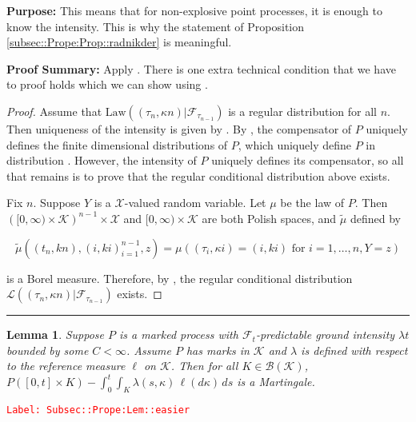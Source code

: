 \documentclass[12pt]{article}
\newcommand{\mc}{\mathcal}
\newcommand{\ms}{\mathscr}
\newcommand{\te}{\text}
\newcommand{\tr}{\textcolor{red}}
\newcommand{\labe}[1]{\tr{\texttt{Label: #1}}}
\newcommand{\purpose}{\textbf{Purpose: }}
\newcommand{\pfsum}{\textbf{Proof Summary: }}
\newcommand{\ind}{\hspace{24pt}}
\newcommand{\lin}{\rule{\linewidth}{0.4 pt}}
\renewcommand{\S}{S}							%
\renewcommand{\t}{t}							%
\renewcommand{\tt}{s}							%
\newcommand{\F}{\mc{F}}							%
\newcommand{\ts}[1]{_{#1}}						%
\newcommand{\const}{C}							%
\newcommand{\Sm}{\ell}							%
\newcommand{\rate}{\lambda}						%
\newcommand{\alt}[1]{\widetilde{#1}}			%
\newcommand{\indx}[1]{_{#1}}					%
\newcommand{\m}{\mu}							%
\newcommand{\law}{\te{Law}}						%
\newcommand{\XX}{Y}								%
\newcommand{\rt}{\tau}							%
\renewcommand{\mark}{\kappa}					%
\newcommand{\rp}{P}								%
\newcommand{\spce}{\mc{X}}						%
\newcommand{\xxx}{z}							%
\newcommand{\mspce}{\mc{K}}						%
\newtheorem{lem}[thms]{Lemma}
\begin{document}
\purpose This means that for non-explosive point processes, it is enough to know the intensity. This is why the statement of Proposition \ref{subsec::Prope:Prop::radnikder} is meaningful.

\pfsum Apply \cite[Propositions 14.3.II(b),14.2.IV(c) and 9.2.III]{DalVer08}. There is one extra technical condition that we have to proof holds which we can show using \cite[Proposition A1.5.III]{DalVer03}.

\begin{proof}
Assume that \(\law((\rt\indx{n},\mark{n})|\F\ts{\rt\indx{n-1}})\) is a regular distribution for all \(n\). Then uniqueness of the intensity is given by \cite[Proposition 14.3.II (b)]{DalVer08}. By \cite[Proposition 14.2.IV (c)]{DalVer08}, the compensator of \(\rp\) uniquely defines the finite dimensional distributions of \(\rp\), which uniquely define \(\rp\) in distribution \cite[Proposition 9.2.III]{DalVer08}. However, the intensity of \(\rp\) uniquely defines its compensator, so all that remains is to prove that the regular conditional distribution above exists.

\ind Fix \(n\). Suppose \(\XX\) is a \(\spce\)-valued random variable. Let \(\m\) be the law of \(\rp\). Then \(\left([0,\infty)\times \mspce\right)^{n-1}\times\spce\) and \([0,\infty)\times \mspce\) are both Polish spaces, and \(\alt{\m}\) defined by 

\[\alt{\m}((\t\indx{n},k{n}),(	{i},k{i})_{i=1}^{n-1},\xxx) = \m\left((\rt\indx{i},\mark{i}) = (	{i},k{i})\te{ for } i=1,\dots,n, \XX = \xxx\right)\]

is a Borel measure. Therefore, by \cite[Proposition A1.5.III]{DalVer03}, the regular conditional distribution \(\ms{L}((\rt\indx{n},\mark{n})|\F\ts{\rt\indx{n-1}})\) exists.
\end{proof}


\lin

\begin{lem}
Suppose \(\rp\) is a marked process with \(\F\ts{\t}\)-predictable ground intensity \(\rate{\t}\) bounded by some \(\const < \infty\). Assume \(\rp\) has marks in \(\mspce\) and \(\rate\) is defined with respect to the reference measure \(\Sm\) on \(\mspce\). Then for all \(K \in \ms{B}(\mspce)\), \(\rp([0,\t]\times K) - \int_0^\t\int_K \rate(\tt,\mark)\,\ell(d\mark)\,ds\) is a Martingale.
\label{Subsec::Prope:Lem::easier}
\end{lem}
\labe{Subsec::Prope:Lem::easier}
\end{document}
